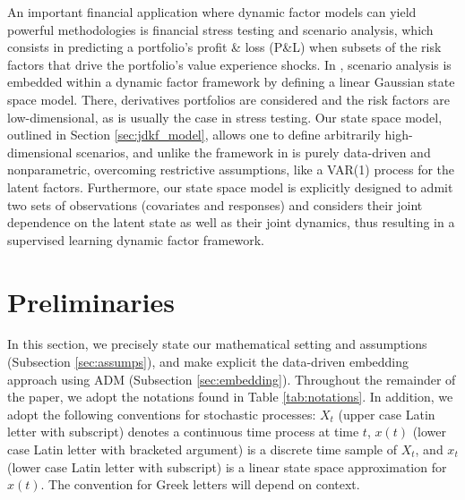 \documentclass[11pt]{article}
\theoremstyle{plain}
\theoremstyle{definition}
\theoremstyle{remark}
\numberwithin{equation}{section}
\begin{document}
An important financial application where dynamic factor models can yield powerful methodologies is financial stress testing and scenario analysis, which consists in predicting a portfolio's profit \& loss (P\&L) when subsets of the risk factors that drive the portfolio's value experience shocks. In \citet{haugh2020scenario}, scenario analysis is embedded within a dynamic factor framework by defining a linear Gaussian state space model. There, derivatives portfolios are considered and the risk factors are low-dimensional, as is usually the case in stress testing. Our state space model, outlined in Section \ref{sec:jdkf_model}, allows one to define arbitrarily high-dimensional scenarios, and unlike the framework in \citet{haugh2020scenario} is purely data-driven and nonparametric, overcoming restrictive assumptions, like a VAR(1) process for the latent factors. Furthermore, our state space model is explicitly designed to admit two sets of observations (covariates and responses) and considers their joint dependence on the latent state as well as their joint dynamics, thus resulting in a supervised learning dynamic factor framework. 

\section{Preliminaries}
\label{sec:model}
In this section, we precisely state our mathematical setting and assumptions (Subsection \ref{sec:assumps}), and make explicit the data-driven embedding approach using ADM (Subsection \ref{sec:embedding}).
Throughout the remainder of the paper, we adopt the notations found in Table \ref{tab:notations}. In addition, we adopt the following conventions for stochastic processes: $X_t$ (upper case Latin letter with subscript) denotes a continuous time process at time $t$, $x(t)$ (lower case Latin letter with bracketed argument) is a discrete time sample of $X_t$, and $x_t$ (lower case Latin letter with subscript) is a linear state space approximation for $x(t)$. The convention for Greek letters will depend on context.
\end{document}
